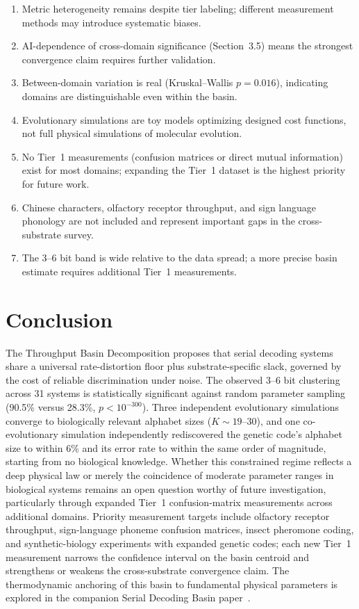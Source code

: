 \documentclass[11pt]{article}
\begin{document}
\begin{enumerate}
    \item Metric heterogeneity remains despite tier labeling; different measurement methods may introduce systematic biases.
    \item AI-dependence of cross-domain significance (Section~3.5) means the strongest convergence claim requires further validation.
    \item Between-domain variation is real (Kruskal--Wallis $p = 0.016$), indicating domains are distinguishable even within the basin.
    \item Evolutionary simulations are toy models optimizing designed cost functions, not full physical simulations of molecular evolution.
    \item No Tier~1 measurements (confusion matrices or direct mutual information) exist for most domains; expanding the Tier~1 dataset is the highest priority for future work.
    \item Chinese characters, olfactory receptor throughput, and sign language phonology are not included and represent important gaps in the cross-substrate survey.
    \item The 3--6 bit band is wide relative to the data spread; a more precise basin estimate requires additional Tier~1 measurements.
\end{enumerate}

\section{Conclusion}

The Throughput Basin Decomposition proposes that serial decoding systems share a universal rate-distortion floor plus substrate-specific slack, governed by the cost of reliable discrimination under noise. The observed 3--6 bit clustering across 31 systems is statistically significant against random parameter sampling (90.5\% versus 28.3\%, $p < 10^{-300}$). Three independent evolutionary simulations converge to biologically relevant alphabet sizes ($K \sim 19$--30), and one co-evolutionary simulation independently rediscovered the genetic code's alphabet size to within 6\% and its error rate to within the same order of magnitude, starting from no biological knowledge. Whether this constrained regime reflects a deep physical law or merely the coincidence of moderate parameter ranges in biological systems remains an open question worthy of future investigation, particularly through expanded Tier~1 confusion-matrix measurements across additional domains. Priority measurement targets include olfactory receptor throughput, sign-language phoneme confusion matrices, insect pheromone coding, and synthetic-biology experiments with expanded genetic codes; each new Tier~1 measurement narrows the confidence interval on the basin centroid and strengthens or weakens the cross-substrate convergence claim. The thermodynamic anchoring of this basin to fundamental physical parameters is explored in the companion Serial Decoding Basin paper~\cite{whitmer2026sdb}.
\end{document}
